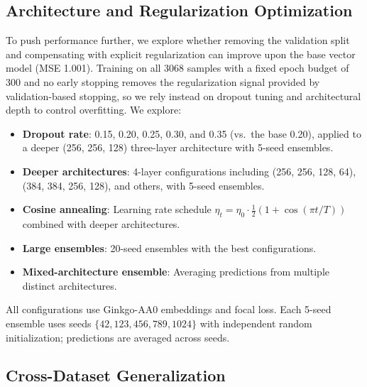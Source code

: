 \documentclass[12pt]{article}
\begin{document}
\subsection{Architecture and Regularization Optimization}
\label{sec:arch_opt_methods}
To push performance further, we explore whether removing the validation split and compensating with explicit regularization can improve upon the base vector model (MSE 1.001).
Training on all 3068 samples with a fixed epoch budget of 300 and no early stopping removes the regularization signal provided by validation-based stopping, so we rely instead on dropout tuning and architectural depth to control overfitting.
We explore:
\begin{itemize}
    \item \textbf{Dropout rate}: 0.15, 0.20, 0.25, 0.30, and 0.35 (vs.\ the base 0.20), applied to a deeper (256, 256, 128) three-layer architecture with 5-seed ensembles.
    \item \textbf{Deeper architectures}: 4-layer configurations including (256, 256, 128, 64), (384, 384, 256, 128), and others, with 5-seed ensembles.
    \item \textbf{Cosine annealing}: Learning rate schedule $\eta_t = \eta_0 \cdot \frac{1}{2}(1 + \cos(\pi t / T))$ combined with deeper architectures.
    \item \textbf{Large ensembles}: 20-seed ensembles with the best configurations.
    \item \textbf{Mixed-architecture ensemble}: Averaging predictions from multiple distinct architectures.
\end{itemize}
All configurations use Ginkgo-AA0 embeddings and focal loss.
Each 5-seed ensemble uses seeds $\{42, 123, 456, 789, 1024\}$ with independent random initialization; predictions are averaged across seeds.

\subsection{Cross-Dataset Generalization}
\label{sec:cross_dataset_methods}
\end{document}

